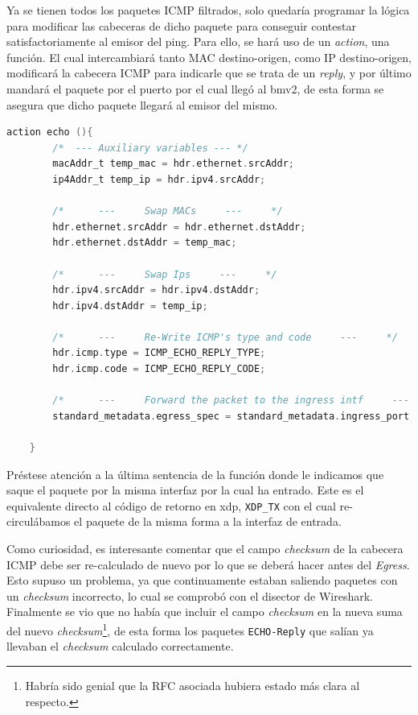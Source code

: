 Ya se tienen todos los paquetes ICMP filtrados, solo quedaría programar la lógica para modificar las cabeceras de dicho paquete para conseguir contestar satisfactoriamente al emisor del ping. Para ello, se hará uso de un \textit{action}, una función. El cual intercambiará tanto MAC destino-origen, como IP destino-origen, modificará la cabecera ICMP para indicarle que se trata de un \textit{reply}, y por último mandará el paquete por el puerto por el cual llegó al \gls{bmv2}, de esta forma se asegura que dicho paquete llegará al emisor del mismo.\\
\par


\begin{lstlisting}[language=C, style=P4-color, caption={Lógica para procesar paquetes ICMP  - Case03},label=code:case03_p4_ether_prog5]
    action echo (){
    	/*	---	Auxiliary variables	---	*/
        macAddr_t temp_mac = hdr.ethernet.srcAddr;
        ip4Addr_t temp_ip = hdr.ipv4.srcAddr;
    
    	/*      ---     Swap MACs     ---     */
    	hdr.ethernet.srcAddr = hdr.ethernet.dstAddr;
        hdr.ethernet.dstAddr = temp_mac;
    
    	/*      ---     Swap Ips     ---     */
     	hdr.ipv4.srcAddr = hdr.ipv4.dstAddr;
    	hdr.ipv4.dstAddr = temp_ip;
      
    	/*      ---     Re-Write ICMP's type and code     ---     */
    	hdr.icmp.type = ICMP_ECHO_REPLY_TYPE;
    	hdr.icmp.code = ICMP_ECHO_REPLY_CODE;
    
    	/*      ---     Forward the packet to the ingress intf     ---     */
    	standard_metadata.egress_spec = standard_metadata.ingress_port;

    }  
\end{lstlisting}
\vspace{0.5cm}

\newpage

Préstese atención a la última sentencia de la función donde le indicamos que saque el paquete por la misma interfaz por la cual ha entrado. Este es el equivalente directo al código de retorno en \gls{xdp}, \texttt{XDP\_TX} con el cual re-circulábamos el paquete de la misma forma a la interfaz de entrada.\\
\par

Como curiosidad, es interesante comentar que el campo \textit{checksum} de la cabecera ICMP debe ser re-calculado de nuevo por lo que se deberá hacer antes del \textit{Egress}. Esto supuso un problema, ya que continuamente estaban saliendo paquetes con un \textit{checksum} incorrecto,  lo cual se comprobó con el disector de Wireshark. Finalmente se vio que no había que incluir el campo \textit{checksum} en la nueva suma del nuevo \textit{checksum}\footnote{Habría sido genial que la RFC asociada hubiera estado más clara al respecto.}, de esta forma los paquetes \texttt{ECHO-Reply} que salían ya llevaban el \textit{checksum} calculado correctamente.\\
\par


